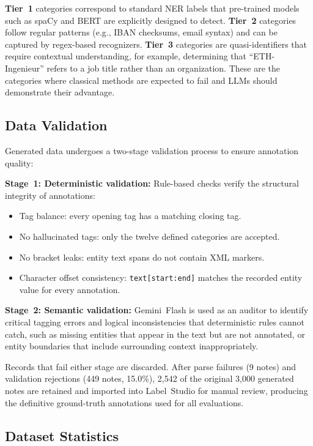 \textbf{Tier~1} categories correspond to standard NER labels that pre-trained
models such as spaCy and BERT are explicitly designed to detect.
\textbf{Tier~2} categories follow regular patterns (e.g., IBAN checksums, email
syntax) and can be captured by regex-based recognizers.
\textbf{Tier~3} categories are quasi-identifiers that require contextual
understanding, for example, determining that ``ETH-Ingenieur'' refers to a
job title rather than an organization. These are the categories where classical
methods are expected to fail and LLMs should demonstrate their advantage.


\subsection{Data Validation}
\label{sec:data_validation}

Generated data undergoes a two-stage validation process to ensure annotation
quality:

\textbf{Stage~1: Deterministic validation:} Rule-based checks verify the
structural integrity of annotations:
\begin{itemize}
    \item Tag balance: every opening tag has a matching closing tag.
    \item No hallucinated tags: only the twelve defined categories are accepted.
    \item No bracket leaks: entity text spans do not contain XML markers.
    \item Character offset consistency: \texttt{text[start:end]} matches the
    recorded entity value for every annotation.
\end{itemize}

\textbf{Stage~2: Semantic validation:} Gemini~Flash is used as an auditor to
identify critical tagging errors and logical inconsistencies that deterministic
rules cannot catch, such as missing entities that appear in the text but are not
annotated, or entity boundaries that include surrounding context inappropriately.

Records that fail either stage are discarded. After parse failures (9
notes) and validation rejections (449 notes, 15.0\%), 2{,}542 of the
original 3{,}000 generated notes are retained and imported into
Label~Studio for manual review, producing the definitive ground-truth
annotations used for all evaluations.


\subsection{Dataset Statistics}
\label{sec:dataset_stats}

